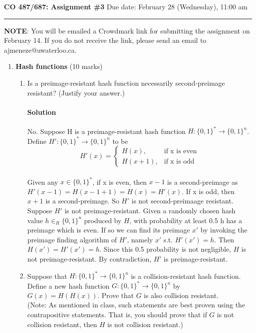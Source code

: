 \documentclass[11pt]{article}
\begin{document}
\noindent
{\large\bf CO 487/687: Assignment \#3} \hfill Due date: February 28 (Wednesday),
11:00 am

\hfill\hrule

\vspace*{2mm}
\noindent
{\bf NOTE}: You will be emailed a Crowdmark link for submitting the
assignment on February 14. If you do not receive the link, please
send an email to ajmeneze@uwaterloo.ca.

\begin{enumerate}

\item {\bf Hash functions} (10 marks)
\begin{enumerate}
\item Is a preimage-resistant hash function necessarily second-preimage
resistant? (Justify your answer.)
\paragraph{Solution} No. Suppose H is a preimage-resistant hash function $H:\{0,1\}^* \to \{0,1\}^n$. Define $H':\{0,1\}^* \to \{0,1\}^n$ to be \\
\[ H'(x)=
\begin{cases}
H(x), & \text{if x is even}\\
H(x+1), & \text{if x is odd}
\end{cases}
\]\\
Given any $x\in \{0,1\}^*$, if x is even, then $x-1$ is a second-preimage as $H'(x-1)=H(x-1+1)=H(x)=H'(x)$. If x is odd, then $x+1$ is a second-preimage. So $H'$ is not second-preimaage resistant.\\
Suppose $H'$ is not preimage-resistant. Given a randomly chosen hash value $h\in_R\{0,1\}^n$ produced by $H$, with probability at least 0.5 h has a preimage which is even. If so we can find its preimage $x'$ by invoking the preimage finding algorithm of $H'$, namely $x'$ s.t. $H'(x')=h$. Then $H(x')=H'(x')=h$. Since this 0.5 probability is not negligible, $H$ is not preimage-resistant. By contradiction, $H'$ is preimage-resistant.

\item Suppose that $H: \{0,1\}^* \rightarrow \{0,1\}^n$ is a collision-resistant
hash function. Define a new hash function $G : \{0,1\}^* \rightarrow
\{0,1\}^n$ by $G(x) = H(H(x))$. Prove that $G$ is also collision resistant.\\
(Note: As mentioned in class, such statements are best proven using the
contrapositive statements. That is, you should prove that if $G$ is not
collision resistant, then $H$ is not collision resistant.)

\end{enumerate}
\end{enumerate}
\end{document}
